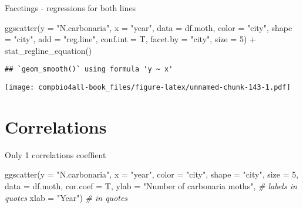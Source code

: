 \documentclass[
]{book}
\newenvironment{Shaded}{\begin{snugshade}}{\end{snugshade}}
\newcommand{\AttributeTok}[1]{\textcolor[rgb]{0.77,0.63,0.00}{#1}}
\newcommand{\CommentTok}[1]{\textcolor[rgb]{0.56,0.35,0.01}{\textit{#1}}}
\newcommand{\DecValTok}[1]{\textcolor[rgb]{0.00,0.00,0.81}{#1}}
\newcommand{\FunctionTok}[1]{\textcolor[rgb]{0.00,0.00,0.00}{#1}}
\newcommand{\NormalTok}[1]{#1}
\newcommand{\SpecialCharTok}[1]{\textcolor[rgb]{0.00,0.00,0.00}{#1}}
\newcommand{\StringTok}[1]{\textcolor[rgb]{0.31,0.60,0.02}{#1}}
\begin{document}
Facetings - regressions for both lines

\begin{Shaded}
\begin{Highlighting}[]
\FunctionTok{ggscatter}\NormalTok{(}\AttributeTok{y =} \StringTok{"N.carbonaria"}\NormalTok{,}
          \AttributeTok{x =} \StringTok{"year"}\NormalTok{,}
          \AttributeTok{data =}\NormalTok{ df.moth,}
          \AttributeTok{color =} \StringTok{"city"}\NormalTok{,}
          \AttributeTok{shape =} \StringTok{"city"}\NormalTok{,}
          \AttributeTok{add =} \StringTok{"reg.line"}\NormalTok{,}
          \AttributeTok{conf.int =}\NormalTok{ T,}
          \AttributeTok{facet.by =} \StringTok{"city"}\NormalTok{,}
          \AttributeTok{size =} \DecValTok{5}\NormalTok{) }\SpecialCharTok{+}
  \FunctionTok{stat\_regline\_equation}\NormalTok{()}
\end{Highlighting}
\end{Shaded}

\begin{verbatim}
## `geom_smooth()` using formula 'y ~ x'
\end{verbatim}

\texttt{[image: compbio4all-book\_files/figure-latex/unnamed-chunk-143-1.pdf]}

\hypertarget{correlations}{%
\section{Correlations}\label{correlations}}

Only 1 correlations coeffient

\begin{Shaded}
\begin{Highlighting}[]
\FunctionTok{ggscatter}\NormalTok{(}\AttributeTok{y =} \StringTok{"N.carbonaria"}\NormalTok{,}
          \AttributeTok{x =} \StringTok{"year"}\NormalTok{,}
          \AttributeTok{color =} \StringTok{"city"}\NormalTok{,}
          \AttributeTok{shape =} \StringTok{"city"}\NormalTok{,}
          \AttributeTok{size =} \DecValTok{5}\NormalTok{,       }
          \AttributeTok{data =}\NormalTok{ df.moth,}
          \AttributeTok{cor.coef =}\NormalTok{ T,}
          \AttributeTok{ylab =} \StringTok{"Number of carbonaria moths"}\NormalTok{, }\CommentTok{\# labels in quotes}
          \AttributeTok{xlab =} \StringTok{"Year"}\NormalTok{)   }\CommentTok{\# in quotes}
\end{Highlighting}
\end{Shaded}
\end{document}
